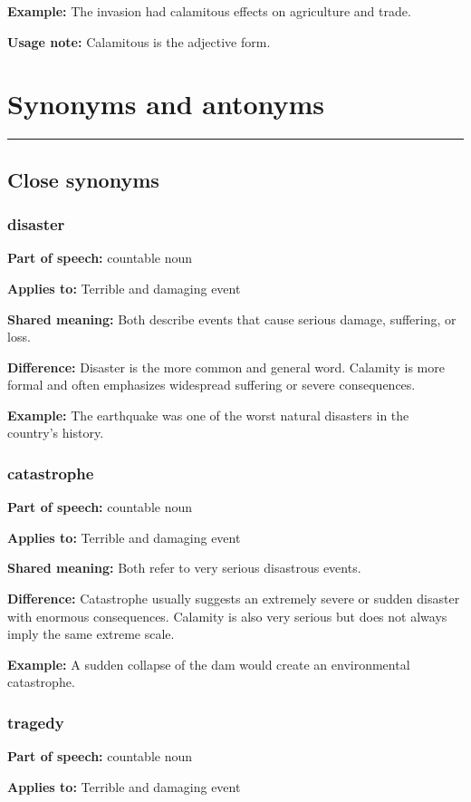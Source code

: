 \documentclass[11pt]{article}
\newcommand{\sectionrule}{\par\vspace{-0.5em}\noindent\textcolor{Accent}{\rule{\linewidth}{0.6pt}}\par}
\begin{document}
\textbf{Example:} The invasion had calamitous effects on agriculture and trade.

\textbf{Usage note:} Calamitous is the adjective form.

\section{Synonyms and antonyms}
\sectionrule
\subsection{Close synonyms}
\subsubsection{disaster}
\textbf{Part of speech:} countable noun

\textbf{Applies to:} Terrible and damaging event

\textbf{Shared meaning:} Both describe events that cause serious damage, suffering, or loss.

\textbf{Difference:} Disaster is the more common and general word. Calamity is more formal and often emphasizes widespread suffering or severe consequences.

\textbf{Example:} The earthquake was one of the worst natural disasters in the country's history.

\subsubsection{catastrophe}
\textbf{Part of speech:} countable noun

\textbf{Applies to:} Terrible and damaging event

\textbf{Shared meaning:} Both refer to very serious disastrous events.

\textbf{Difference:} Catastrophe usually suggests an extremely severe or sudden disaster with enormous consequences. Calamity is also very serious but does not always imply the same extreme scale.

\textbf{Example:} A sudden collapse of the dam would create an environmental catastrophe.

\subsubsection{tragedy}
\textbf{Part of speech:} countable noun

\textbf{Applies to:} Terrible and damaging event
\end{document}
